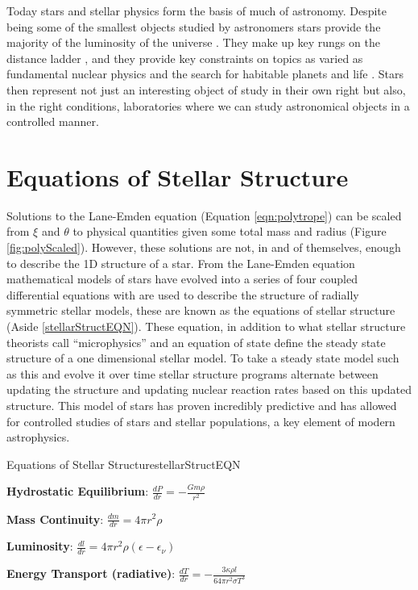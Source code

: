 Today stars and stellar physics form the basis of much of astronomy. Despite
being some of the smallest objects studied by astronomers stars provide the
majority of the luminosity of the universe \citep{Fermi-LATCollaboration2018}.
They make up key rungs on the distance ladder \citep{Webb1999, Jofre2015,
Pasachoff2020}, and they provide key constraints on topics as varied as
fundamental nuclear physics \citep{Lattimer2007, Greif2020} and the search for habitable planets and
life \citep{Kaltenegger2010, Shields2016, Giles2019, Carrillo2020}. Stars then
represent not just an interesting object of study in their own right but also,
in the right conditions, laboratories where we can study astronomical objects
in a controlled manner.

\section{Equations of Stellar Structure}
Solutions to the Lane-Emden equation (Equation \ref{eqn:polytrope}) can be
scaled from $\xi$ and $\theta$ to physical quantities given some total mass and
radius (Figure \ref{fig:polyScaled}). However, these solutions are not, in and
of themselves, enough to describe the 1D structure of a star. From the
Lane-Emden equation mathematical models of stars have evolved into a series of
four coupled differential equations with are used to describe the structure of
radially symmetric stellar models, these are known as the equations of stellar
structure (Aside \ref{stellarStructEQN}). These equation, in addition to what
stellar structure theorists call ``microphysics'' and an equation of state
define the steady state structure of a one dimensional stellar model. To take a
steady state model such as this and evolve it over time stellar structure
programs alternate between updating the structure and updating nuclear reaction
rates based on this updated structure. This model of stars has proven
incredibly predictive and has allowed for controlled studies of stars and
stellar populations, a key element of modern astrophysics.

\begin{sidebar}[l]{Equations of Stellar Structure}{stellarStructEQN}

  \textbf{Hydrostatic Equilibrium}: $\frac{dP}{dr} = -\frac{Gm\rho}{r^{2}}$

  \textbf{Mass Continuity}: $\frac{dm}{dr} = 4\pi r^{2}\rho$

  \textbf{Luminosity}: $\frac{dl}{dr} = 4\pi r^{2}\rho(\epsilon - \epsilon_{\nu})$

  \textbf{Energy Transport (radiative)}: $\frac{dT}{dr} = -\frac{3\kappa\rho l}{64\pi r^{2}\sigma T^{3}}$
\end{sidebar}

